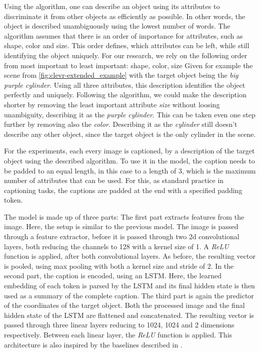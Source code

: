 Using the algorithm, one can describe an object using its attributes to discriminate it from other objects as efficiently as possible.
In other words, the object is described unambiguously using the lowest number of words.
The algorithm assumes that there is an order of importance for attributes, such as shape, color and size.
This order defines, which attributes can be left, while still identifying the object uniquely.
For our research, we rely on the following order from most important to least important: shape, color, size
Given for example the scene from \ref*{fig:clevr-extended_example} with the target object being the \emph{big purple cylinder}.
Using all three attributes, this description identifies the object perfectly and uniquely.
Following the algorithm, we could make the description shorter by removing the least important attribute \emph{size} without loosing unambiguity, describing it as the \emph{purple cylinder}.
This can be taken even one step further by removing also the \emph{color}.
Describing it as the \emph{cylinder} still doesn't describe any other object, since the target object is the only cylinder in the scene.

For the experiments, each every image is captioned, by a description of the target object using the described algorithm.
To use it in the model, the caption needs to be padded to an equal length, in this case to a length of 3, which is the maximum number of attributes that can be used.
For this, as standard practice in captioning tasks, the captions are padded at the end with a specified padding token.

The model is made up of three parts:
The first part extracts features from the image.
Here, the setup is similar to the previous model.
The image is passed through a feature extractor, before it is passed through two 2d convolutional layers, both reducing the channels to 128 with a kernel size of 1.
A \emph{ReLU} function is applied, after both convolutional layers.
As before, the resulting vector is pooled, using max pooling with both a kernel size and stride of 2.
In the second part, the caption is encoded, using an LSTM.
Here, the learned embedding of each token is parsed by the LSTM and its final hidden state is then used as a summary of the complete caption.
The third part is again the predictor of the coordinates of the target object.
Both the processed image and the final hidden state of the LSTM are flattened and concatenated.
The resulting vector is passed through three linear layers reducing to 1024, 1024 and 2 dimensions respectively.
Between each linear layer, the \emph{ReLU} function is applied.
This architecture is also inspired by the baselines described in \cite{Johnson2017}.

